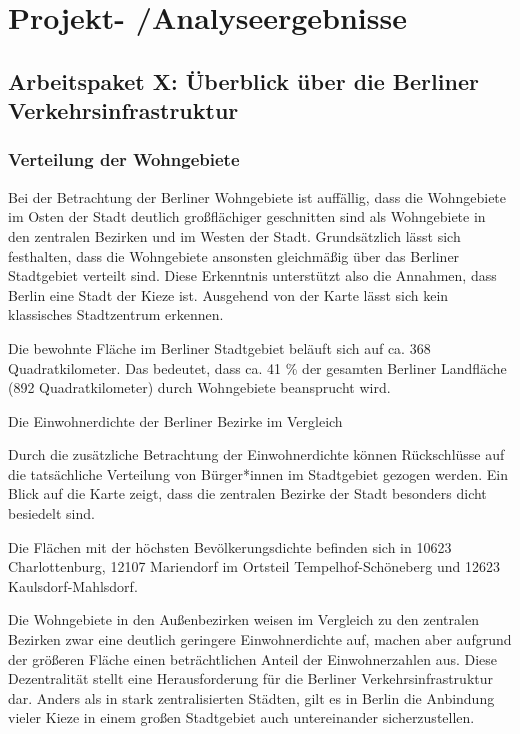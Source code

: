\newpage
\section{Projekt- /Analyseergebnisse} \label{ergebnisse}

\subsection{Arbeitspaket X: Überblick über die Berliner Verkehrsinfrastruktur}

\subsubsection{Verteilung der Wohngebiete}

Bei der Betrachtung der Berliner Wohngebiete ist auffällig, dass die Wohngebiete im Osten der Stadt deutlich großflächiger geschnitten sind als Wohngebiete in den zentralen Bezirken und im Westen der Stadt. Grundsätzlich lässt sich festhalten, dass die Wohngebiete ansonsten gleichmäßig über das Berliner Stadtgebiet verteilt sind. Diese Erkenntnis unterstützt also die Annahmen, dass Berlin eine Stadt der Kieze ist. Ausgehend von der Karte lässt sich kein klassisches Stadtzentrum erkennen.

Die bewohnte Fläche im Berliner Stadtgebiet beläuft sich auf ca. 368 Quadratkilometer. Das bedeutet, dass ca. 41 \% der gesamten Berliner Landfläche (892 Quadratkilometer) durch Wohngebiete beansprucht wird.

Die Einwohnerdichte der Berliner Bezirke im Vergleich

Durch die zusätzliche Betrachtung der Einwohnerdichte können Rückschlüsse auf die tatsächliche Verteilung von Bürger*innen im Stadtgebiet gezogen werden. Ein Blick auf die Karte zeigt, dass die zentralen Bezirke der Stadt besonders dicht besiedelt sind.

Die Flächen mit der höchsten Bevölkerungsdichte befinden sich in 10623 Charlottenburg, 12107 Mariendorf im Ortsteil Tempelhof-Schöneberg und 12623 Kaulsdorf-Mahlsdorf.

Die Wohngebiete in den Außenbezirken weisen im Vergleich zu den zentralen Bezirken zwar eine deutlich geringere Einwohnerdichte auf, machen aber aufgrund der größeren Fläche einen beträchtlichen Anteil der Einwohnerzahlen aus. Diese Dezentralität stellt eine Herausforderung für die Berliner Verkehrsinfrastruktur dar. Anders als in stark zentralisierten Städten, gilt es in Berlin die Anbindung vieler Kieze in einem großen Stadtgebiet auch untereinander sicherzustellen.



